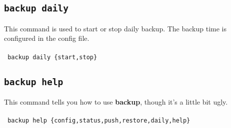 \documentclass[a4paper]{article}
\begin{document}
\subsection{{\large\tt backup daily}}
This command is used to start or stop daily backup. The backup time is configured in the config file. \\
\\
{\tt
    backup daily \{start,stop\}
}

\subsection{{\large\tt backup help}}
This command tells you how to use \textbf{backup}, though it's a little bit ugly. \\
\\
{\tt
    backup help \{config,status,push,restore,daily,help\}
}
\end{document}
